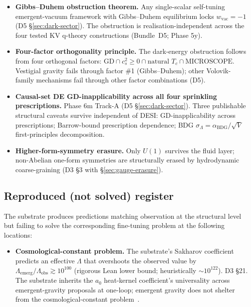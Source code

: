 \documentclass[aps,prd,reprint,nofootinbib,superscriptaddress]{revtex4-2}
\begin{document}
\begin{itemize}
\item \textbf{Gibbs--Duhem obstruction theorem.} Any single-scalar
  self-tuning emergent-vacuum framework with Gibbs--Duhem equilibrium
  locks $w_{\mathrm{vac}} = -1$ (D5 \S\ref{sec:dark-sector}). The
  obstruction is realisation-independent across the four tested KV
  q-theory constructions (Bundle~D5; Phase 5y).
\item \textbf{Four-factor orthogonality principle.} The dark-energy
  obstruction follows from four orthogonal factors:
  $\text{GD} \cap c_s^{2}\!\geq\!0 \cap \text{natural }T_c \cap
  \text{MICROSCOPE}$. Vestigial gravity fails through factor \#1
  (Gibbs--Duhem); other Volovik-family mechanisms fail through other
  factor combinations (D5).
\item \textbf{Causal-set DE GD-inapplicability across all four
  sprinkling prescriptions.} Phase 6m Track-A (D5
  \S\ref{sec:dark-sector}). Three publishable structural caveats
  survive independent of DESI: GD-inapplicability across
  prescriptions; Barrow-bound prescription dependence; BDG
  $\sigma_\Lambda = \alpha_{\mathrm{BDG}}/\sqrt{V}$ first-principles
  decomposition.
\item \textbf{Higher-form-symmetry erasure.} Only $U(1)$ survives the
  fluid layer; non-Abelian one-form symmetries are structurally
  erased by hydrodynamic coarse-graining (D3 \S 3 with
  \S\ref{sec:gauge-erasure}).
\end{itemize}

\subsection{Reproduced (not solved) register}

The substrate produces predictions matching observation at the
structural level but failing to solve the corresponding fine-tuning
problem at the following locations:

\begin{itemize}
\item \textbf{Cosmological-constant problem.} The substrate's
  Sakharov coefficient predicts an effective $\Lambda$ that
  overshoots the observed value by
  $\Lambda_{\mathrm{emerg}}/\Lambda_{\mathrm{obs}} \gtrsim 10^{100}$
  (rigorous Lean lower bound; heuristically $\sim 10^{122}$).
  D3 \S 21. The substrate inherits the $a_0$ heat-kernel
  coefficient's universality across emergent-gravity proposals at
  one-loop; emergent gravity does not shelter from the
  cosmological-constant problem~\cite{Weinberg1989}.
\end{itemize}
\end{document}

